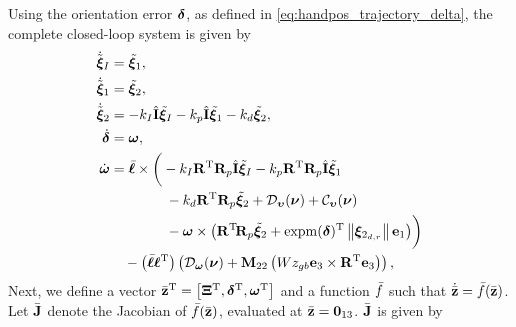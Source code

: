 Using the orientation error $\bm{\delta}$, as defined in \eqref{eq:handpos_trajectory_delta}, the complete closed-loop system is given by
\begin{subequations}
    \begin{align}
        \dot{\tilde{\bm{\xi}}}_I &= \tilde{\bm{\xi}}_1, \\
        \dot{\tilde{\bm{\xi}}}_1 &= \tilde{\bm{\xi}}_2, \\
        \dot{\tilde{\bm{\xi}}}_2 &= -k_I \hat{\mathbf{I}} \tilde{\bm{\xi}}_I - k_p \hat{\mathbf{I}} \tilde{\bm{\xi}}_1 - k_d \tilde{\bm{\xi}}_2, \\
        \dot{\bm{\delta}} &= \bm{\omega}, \\
        \dot{\bm{\omega}} &= \Bar{\boldsymbol{\ell}} \times \bigg(-k_I \mathbf{R}^{\mathrm{T}} \mathbf{R}_p \hat{\mathbf{I}} \tilde{\bm{\xi}}_I - k_p \mathbf{R}^{\mathrm{T}} \mathbf{R}_p \hat{\mathbf{I}} \tilde{\bm{\xi}}_1 \nonumber \\
        &\qquad \qquad - k_d \mathbf{R}^{\mathrm{T}} \mathbf{R}_p \tilde{\bm{\xi}}_2 + \mathcal{D}_{\bm{\upsilon}}(\bm{\nu}) + \mathcal{C}_{\bm{\upsilon}}(\bm{\nu}) \nonumber \\
        &\qquad \qquad - \bm{\omega} \times \left(\mathbf{R}^{\mathrm{T}}\! \mathbf{R}_p \tilde{\bm{\xi}}_2 + {\rm expm}(\bm{\delta})^{\mathrm{T}} \left\|\bm{\xi}_{2_{d,r}}\right\|\mathbf{e}_1\right)\!\bigg) \nonumber \\
        &\quad - \left(\Bar{\boldsymbol{\ell}}\boldsymbol{\ell}^{\mathrm{T}}\right) \left(\mathcal{D}_{\bm{\omega}}(\bm{\nu}) + \mathbf{M}_{22}\left(Wz_{gb} \mathbf{e}_3 \times \mathbf{R}^{\mathrm{T}} \mathbf{e}_3\right)\right),
    \end{align}
\end{subequations}
Next, we define a vector $\Bar{\mathbf{z}}^{\mathrm{T}} = \left[\bm{\Xi}^{\mathrm{T}}, \bm{\delta}^{\mathrm{T}}, \bm{\omega}^{\mathrm{T}}\right]$ and a function $\Bar{f}$ such that $\dot{\Bar{\mathbf{z}}} = \Bar{f}(\Bar{\mathbf{z}})$.
Let $\Bar{\mathbf{J}}$ denote the Jacobian of $\Bar{f}(\Bar{\mathbf{z}})$, evaluated at $\Bar{\mathbf{z}} = \mathbf{0}_{13}$.
$\Bar{\mathbf{J}}$ is given by

